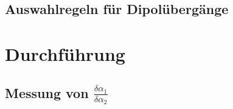 \documentclass[bigchapter,colorback,accentcolor=tud4b,linedtoc,11pt]{tudreport}
\begin{document}
\section{Auswahlregeln für Dipolübergänge}

\chapter{Durchführung}
\section{Messung von $\frac{\delta\alpha_1}{\delta\alpha_2}$}
\end{document}
